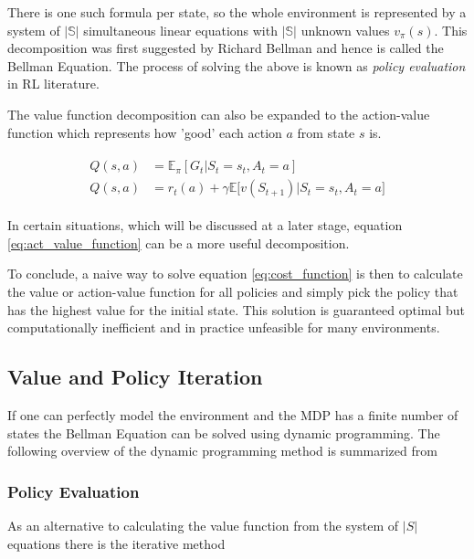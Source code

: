 There is one such formula per state, so the whole environment is represented by a system of $|\mathbb{S}|$ simultaneous linear equations with $|\mathbb{S}|$ unknown values $v_\pi(s)$. This decomposition was first suggested by Richard Bellman\citep{bellman_1957} and hence is called the Bellman Equation. The process of solving the above is known as \textit{policy evaluation} in RL literature.

The value function decomposition can also be expanded to the action-value function which represents how 'good' each action $a$ from state $s$ is.

\begin{align}
\begin{split}
    \label{eq:act_value_function} 
    Q(s, a) &=  \mathbb{E}_\pi[G_t|S_t=s_t, A_t=a] \\
    Q(s, a) &= r_t(a) + \gamma\mathbb{E}\big[v(S_{t+1})|S_t=s_t, A_t = a\big]
\end{split}
\end{align}

In certain situations, which will be discussed at a later stage, equation \ref{eq:act_value_function} can be a more useful decomposition.

To conclude, a naive way to solve equation \ref{eq:cost_function} is then to calculate the value or action-value function for all policies and simply pick the policy that has the highest value for the initial state. This solution is guaranteed optimal but computationally inefficient and in practice unfeasible for many environments.

\citep[p.~58-61]{powell_2011}\citep[p.~59]{sutton_barto_2018}

\subsection{Value and Policy Iteration}

If one can perfectly model the environment and the MDP has a finite number of states the Bellman Equation can be solved using dynamic programming. The following overview of the dynamic programming method is summarized from \cite[p.~74-84]{sutton_barto_2018}

\subsubsection{Policy Evaluation}

As an alternative to calculating the value function from the system of $|S|$ equations there is the iterative method

